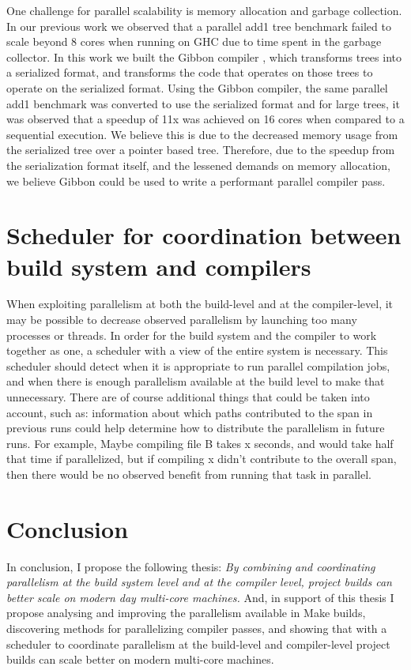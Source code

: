 \documentclass[10pt]{article}
\begin{document}
One challenge for parallel scalability is memory allocation and garbage collection.  In our previous work \cite{vollmer2017compiling}
we observed that a parallel add1 tree benchmark failed to scale beyond 8 cores when running on GHC due to
time spent in the garbage collector.  In this work we built the Gibbon compiler \cite{vollmer2017compiling},
which transforms trees into a serialized format, and transforms the code that operates on those trees to operate
on the serialized format.  Using the Gibbon compiler, the same parallel add1 benchmark was converted to
use the serialized format and for large trees, it was observed that a speedup of 11x was achieved on 16 cores
when compared to a sequential execution.  We believe this is due to the decreased memory usage from the
serialized tree over a pointer based tree.  Therefore, due to the speedup from the serialization format
itself, and the lessened demands on memory allocation, we believe Gibbon could be used to write a performant
parallel compiler pass.


\section{Scheduler for coordination between build system and compilers}

When exploiting parallelism at both the build-level and at the compiler-level, it may be possible to
decrease observed parallelism by launching too many processes or threads.  In order for the build
system and the compiler to work together as one, a scheduler with a view of the entire system
is necessary.  This scheduler should detect when it is appropriate to run parallel compilation
jobs, and when there is enough parallelism available at the build level to make that unnecessary.
There are of course additional things that could be taken into account, such as: information about which
paths contributed to the span in previous runs could help determine how
to distribute the parallelism in future runs.
For example, Maybe compiling file B takes x
seconds, and would take half that time if parallelized, but if compiling x didn't contribute to
the overall span, then there would be no observed benefit from running that task in parallel.

\section{Conclusion}

In conclusion, I propose the following thesis: \emph{By combining and coordinating parallelism at the build system level
and at the compiler level, project builds can better scale on modern day multi-core
machines.}  And, in support of this thesis I propose analysing and improving the parallelism available in Make builds,
discovering methods for parallelizing compiler passes, and showing that with a scheduler to coordinate parallelism at
the build-level and compiler-level project builds can scale better on modern multi-core machines.

\newpage


\end{document}
